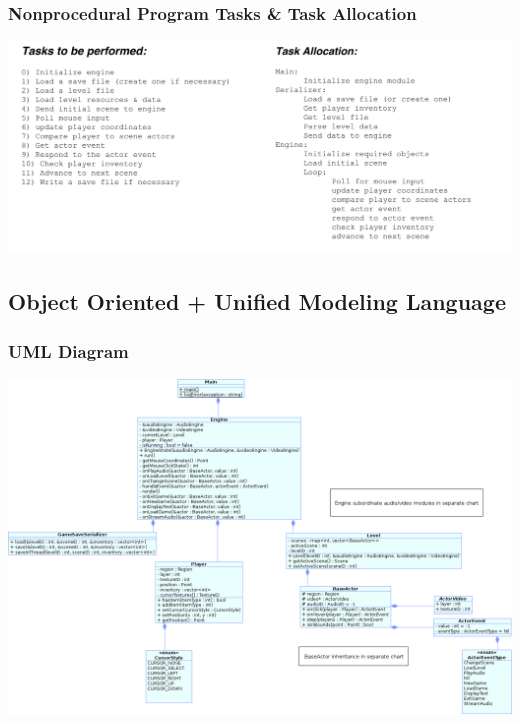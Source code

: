 \documentclass{article}
\begin{document}
		\subsubsection{Nonprocedural Program Tasks \& Task Allocation}
			\begin{center}
				\includegraphics[scale=0.74,angle=90]{Jackson34.png}
			\end{center}
	\subsection{Object Oriented + Unified Modeling Language}
		\subsubsection{UML Diagram}
			\begin{center}
				\includegraphics[scale=0.49,angle=90]{MainClasses.png}
			\end{center}
\end{document}
